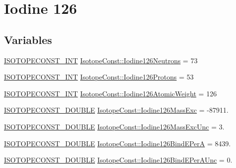 \hypertarget{group___isotope_const-_iodine-_i126}{}\section{Iodine 126}
\label{group___isotope_const-_iodine-_i126}
\subsection*{Variables}
\begin{DoxyCompactItemize}
\item 
\mbox{\hyperlink{group___isotope_const-_macros_ga5f18360b3e99483a35c32d789e62621c}{I\+S\+O\+T\+O\+P\+E\+C\+O\+N\+S\+T\+\_\+\+I\+NT}} \mbox{\hyperlink{group___isotope_const-_iodine-_i126_gaeca78b23f5b9f599ce9d3b85af9163f8}{Isotope\+Const\+::\+Iodine126\+Neutrons}} = 73
\item 
\mbox{\hyperlink{group___isotope_const-_macros_ga5f18360b3e99483a35c32d789e62621c}{I\+S\+O\+T\+O\+P\+E\+C\+O\+N\+S\+T\+\_\+\+I\+NT}} \mbox{\hyperlink{group___isotope_const-_iodine-_i126_ga39c5c2e22248883b1dfc8a3c0690004d}{Isotope\+Const\+::\+Iodine126\+Protons}} = 53
\item 
\mbox{\hyperlink{group___isotope_const-_macros_ga5f18360b3e99483a35c32d789e62621c}{I\+S\+O\+T\+O\+P\+E\+C\+O\+N\+S\+T\+\_\+\+I\+NT}} \mbox{\hyperlink{group___isotope_const-_iodine-_i126_gaf4eb3e2b4fff2a32128b51bc44c94998}{Isotope\+Const\+::\+Iodine126\+Atomic\+Weight}} = 126
\item 
\mbox{\hyperlink{group___isotope_const-_macros_ga8f45a7272ce02c0b4c65c44636ed719a}{I\+S\+O\+T\+O\+P\+E\+C\+O\+N\+S\+T\+\_\+\+D\+O\+U\+B\+LE}} \mbox{\hyperlink{group___isotope_const-_iodine-_i126_gaca97c1ce16b98378d17baa5af9f7eb72}{Isotope\+Const\+::\+Iodine126\+Mass\+Exc}} = -\/87911.
\item 
\mbox{\hyperlink{group___isotope_const-_macros_ga8f45a7272ce02c0b4c65c44636ed719a}{I\+S\+O\+T\+O\+P\+E\+C\+O\+N\+S\+T\+\_\+\+D\+O\+U\+B\+LE}} \mbox{\hyperlink{group___isotope_const-_iodine-_i126_ga3246e0a8d40f0b3258488872f9498ec2}{Isotope\+Const\+::\+Iodine126\+Mass\+Exc\+Unc}} = 3.
\item 
\mbox{\hyperlink{group___isotope_const-_macros_ga8f45a7272ce02c0b4c65c44636ed719a}{I\+S\+O\+T\+O\+P\+E\+C\+O\+N\+S\+T\+\_\+\+D\+O\+U\+B\+LE}} \mbox{\hyperlink{group___isotope_const-_iodine-_i126_ga49b4279388b940a91c0539a530e2a4cc}{Isotope\+Const\+::\+Iodine126\+Bind\+E\+PerA}} = 8439.
\item 
\mbox{\hyperlink{group___isotope_const-_macros_ga8f45a7272ce02c0b4c65c44636ed719a}{I\+S\+O\+T\+O\+P\+E\+C\+O\+N\+S\+T\+\_\+\+D\+O\+U\+B\+LE}} \mbox{\hyperlink{group___isotope_const-_iodine-_i126_ga4f1dd1f988bb9f1a26dc32e6528acae1}{Isotope\+Const\+::\+Iodine126\+Bind\+E\+Per\+A\+Unc}} = 0.

\end{DoxyCompactItemize}
